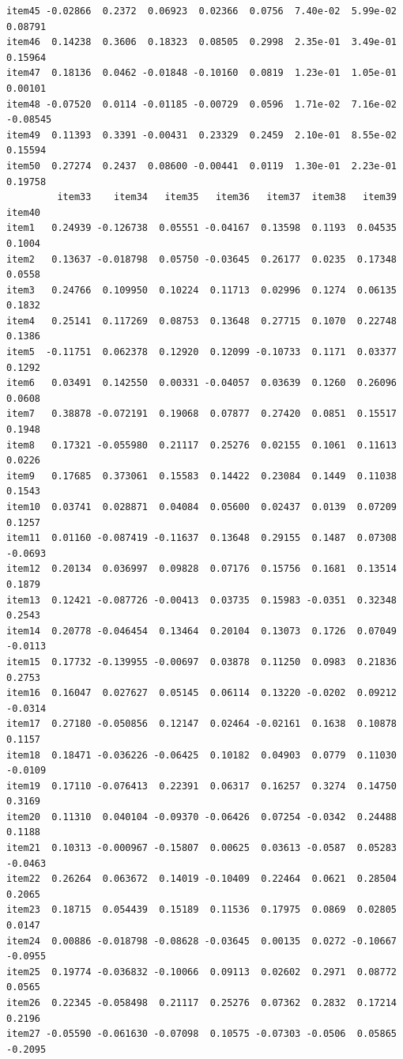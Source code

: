 \documentclass[
  a4paper,
]{ltjsbook}
\begin{document}
\begin{verbatim}
item45 -0.02866  0.2372  0.06923  0.02366  0.0756  7.40e-02  5.99e-02  0.08791
item46  0.14238  0.3606  0.18323  0.08505  0.2998  2.35e-01  3.49e-01  0.15964
item47  0.18136  0.0462 -0.01848 -0.10160  0.0819  1.23e-01  1.05e-01  0.00101
item48 -0.07520  0.0114 -0.01185 -0.00729  0.0596  1.71e-02  7.16e-02 -0.08545
item49  0.11393  0.3391 -0.00431  0.23329  0.2459  2.10e-01  8.55e-02  0.15594
item50  0.27274  0.2437  0.08600 -0.00441  0.0119  1.30e-01  2.23e-01  0.19758
         item33    item34   item35   item36   item37  item38   item39  item40
item1   0.24939 -0.126738  0.05551 -0.04167  0.13598  0.1193  0.04535  0.1004
item2   0.13637 -0.018798  0.05750 -0.03645  0.26177  0.0235  0.17348  0.0558
item3   0.24766  0.109950  0.10224  0.11713  0.02996  0.1274  0.06135  0.1832
item4   0.25141  0.117269  0.08753  0.13648  0.27715  0.1070  0.22748  0.1386
item5  -0.11751  0.062378  0.12920  0.12099 -0.10733  0.1171  0.03377  0.1292
item6   0.03491  0.142550  0.00331 -0.04057  0.03639  0.1260  0.26096  0.0608
item7   0.38878 -0.072191  0.19068  0.07877  0.27420  0.0851  0.15517  0.1948
item8   0.17321 -0.055980  0.21117  0.25276  0.02155  0.1061  0.11613  0.0226
item9   0.17685  0.373061  0.15583  0.14422  0.23084  0.1449  0.11038  0.1543
item10  0.03741  0.028871  0.04084  0.05600  0.02437  0.0139  0.07209  0.1257
item11  0.01160 -0.087419 -0.11637  0.13648  0.29155  0.1487  0.07308 -0.0693
item12  0.20134  0.036997  0.09828  0.07176  0.15756  0.1681  0.13514  0.1879
item13  0.12421 -0.087726 -0.00413  0.03735  0.15983 -0.0351  0.32348  0.2543
item14  0.20778 -0.046454  0.13464  0.20104  0.13073  0.1726  0.07049 -0.0113
item15  0.17732 -0.139955 -0.00697  0.03878  0.11250  0.0983  0.21836  0.2753
item16  0.16047  0.027627  0.05145  0.06114  0.13220 -0.0202  0.09212 -0.0314
item17  0.27180 -0.050856  0.12147  0.02464 -0.02161  0.1638  0.10878  0.1157
item18  0.18471 -0.036226 -0.06425  0.10182  0.04903  0.0779  0.11030 -0.0109
item19  0.17110 -0.076413  0.22391  0.06317  0.16257  0.3274  0.14750  0.3169
item20  0.11310  0.040104 -0.09370 -0.06426  0.07254 -0.0342  0.24488  0.1188
item21  0.10313 -0.000967 -0.15807  0.00625  0.03613 -0.0587  0.05283 -0.0463
item22  0.26264  0.063672  0.14019 -0.10409  0.22464  0.0621  0.28504  0.2065
item23  0.18715  0.054439  0.15189  0.11536  0.17975  0.0869  0.02805  0.0147
item24  0.00886 -0.018798 -0.08628 -0.03645  0.00135  0.0272 -0.10667 -0.0955
item25  0.19774 -0.036832 -0.10066  0.09113  0.02602  0.2971  0.08772  0.0565
item26  0.22345 -0.058498  0.21117  0.25276  0.07362  0.2832  0.17214  0.2196
item27 -0.05590 -0.061630 -0.07098  0.10575 -0.07303 -0.0506  0.05865 -0.2095

\end{verbatim}
\end{document}
